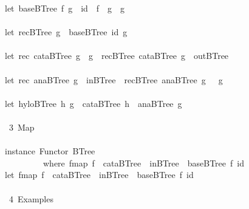 \documentclass[a4paper]{article}
\begin{document}
\begin{tabbing}
\ttfamily ~let~baseBTree~f~g~~id~~f~~g~~g\\
\ttfamily ~\\
\ttfamily ~let~recBTree~g~~baseBTree~id~g\\
\ttfamily ~\\
\ttfamily ~let~rec~cataBTree~g~~g~~recBTree~cataBTree~g~~outBTree\\
\ttfamily ~\\
\ttfamily ~let~rec~anaBTree~g~~inBTree~~recBTree~anaBTree~g~~~g\\
\ttfamily ~\\
\ttfamily ~let~hyloBTree~h~g~~cataBTree~h~~anaBTree~g\\
\ttfamily ~\\
\ttfamily ~~3~Map~\\
\ttfamily ~\\
\ttfamily ~instance~Functor~BTree\\
\ttfamily ~~~~~~~~~~where~fmap~f~~cataBTree~~inBTree~~baseBTree~f~id~\\
\ttfamily ~let~fmap~f~~cataBTree~~inBTree~~baseBTree~f~id~\\
\ttfamily ~\\
\ttfamily ~~4~Examples~\\

\end{tabbing}
\end{document}
